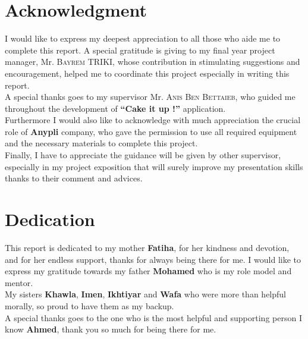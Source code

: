 \documentclass[12pt,a4paper]{report}
\begin{document}
	
	
	
	
	\setcounter{page}{1}
	
	\chapter*{\centering Acknowledgment}
	
	I would like to express my deepest appreciation to all those who aide me to complete this report.  A special gratitude is giving to my final year project  manager, Mr. \textsc{Bayrem TRIKI}, whose contribution in stimulating suggestions and encouragement,  helped me to coordinate this project especially in writing this report.\\
	
	 A special thanks goes to my supervisor Mr. \textsc{Anis Ben Bettaieb}, who guided me throughout the development of  \textbf{``Cake it up !''} application.\\
	
	Furthermore I would also like to acknowledge with much appreciation the crucial role of \textbf{Anypli} company, who gave the permission to use all required  equipment and the necessary materials to complete this project. \\
	

	Finally, I have to appreciate the guidance will be given by other supervisor, especially in my project exposition that will surely improve my presentation skills thanks to their comment and advices.
	\cleardoublepage
	\chapter*{\centering Dedication}
	This report is dedicated to my mother \textbf{Fatiha}, for her kindness and devotion, and for her endless support, thanks for always being there for me.
	I would like to express my gratitude towards my father  \textbf{Mohamed} who is my role model and mentor.\\
	
	 My sisters \textbf{Khawla}, \textbf{Imen}, \textbf{Ikhtiyar} and \textbf{Wafa} who were more than helpful morally, so proud to have them as my backup.\\
	 
	  A special thanks goes to the one who is the most helpful and supporting person I know \textbf{Ahmed}, thank you so much for being there for me.\\
	  
\end{document}
